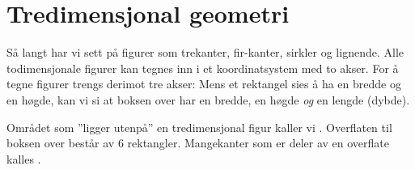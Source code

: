 \newpage
{}

\section{Tredimensjonal geometri}
Så langt har vi sett på  figurer som trekanter, fir-kanter, sirkler og lignende. Alle todimensjonale figurer kan tegnes inn i et koordinatsystem med to akser.
For å tegne  figurer trengs derimot tre akser:
Mens et rektangel sies å ha en bredde og en høgde, kan vi si at boksen over har en bredde, en høgde \textsl{og} en lengde (dybde). \vsk

Området som ''ligger utenpå'' en tredimensjonal figur kaller vi . Overflaten til boksen over består av 6 rektangler. Mangekanter som er deler av en overflate kalles .

